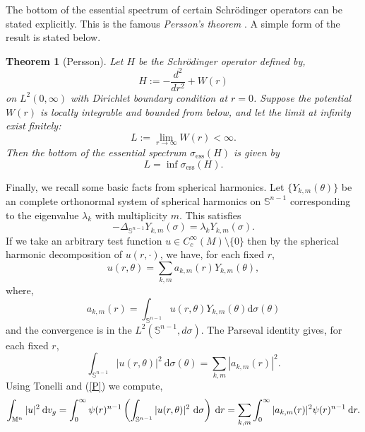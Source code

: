 \documentclass[a4paper,11pt,reqno]{amsart}
\renewcommand\eqref[1]{(\ref{#1})}
\theoremstyle{plain}
\newtheorem{theorem}{Theorem}[section]
\numberwithin{equation}{section} \allowdisplaybreaks
\newcommand{\dvg}{\: {\rm d}v_{g}}
\newcommand{\m}{\mathbb{M}^n}
\newcommand{\dr}{\:{\rm d}r}
\newcommand{\sn}{\mathbb{S}^{n-1}}
\begin{document}
The bottom of the essential spectrum of certain Schr\"odinger operators can be stated explicitly. This is the famous \textit{Persson's theorem} \cite{Persson}. A simple form of the result is stated below.
\begin{theorem}[Persson]
    Let $H$ be the Schr\"odinger operator defined by,
    \begin{equation*}
        H:=-\frac{d^2}{dr^2}+W(r)
    \end{equation*}
    on $L^2(0,\infty)$ with Dirichlet boundary condition at $r=0$. Suppose the potential $W(r)$ is locally integrable and bounded from below, and let the limit at infinity exist finitely:
    \begin{equation*}
        L:= \lim_{r \to \infty}W(r)<\infty.
    \end{equation*}
    Then the bottom of the essential spectrum $\sigma_{\text{ess}}(H)$ is given by 
    \begin{equation*}
        L=\inf\sigma_{\text{ess}}(H).
    \end{equation*}
\end{theorem}
\medskip
Finally, we recall some basic facts from spherical harmonics. Let $\{Y_{k,m}(\theta)\}$ be an complete orthonormal system of spherical harmonics on $\sn$ corresponding to the eigenvalue $\lambda_k$ with multiplicity $m$. This satisfies
\begin{equation*}
    -\Delta_{\sn} Y_{k,m}(\sigma)=\lambda_k Y_{k,m}(\sigma).
\end{equation*}
If we take an arbitrary test function $u \in C^{\infty}_{c}(M)\setminus \{0\}$ then by the spherical harmonic decomposition of $u(r,\cdot)$, we have, for each fixed $r$,
\begin{equation*}
    u(r,\theta)= \sum_{k,m} a_{k,m}(r)Y_{k,m}(\theta),
\end{equation*}
where,
\begin{equation*}
    a_{k,m}(r)=\int_{\sn} u(r,\theta)Y_{k,m}(\theta)\mathrm{d}\sigma(\theta)
\end{equation*}
and the convergence is in the $L^2(\sn, d\sigma)$. The Parseval identity gives, for each fixed $r$,
\begin{equation}\label{P}
    \int_{\sn} |u(r,\theta)|^2\ \mathrm{d}\sigma(\theta)= \sum_{k,m}|a_{k,m}(r)|^2.
\end{equation}
Using Tonelli and \eqref{P} we compute,
\begin{equation}\label{denominator}
    \int_{\m}|u|^2\dvg=\int_0^{\infty}\psi(r)^{n-1}\left(\int_{\sn}|u(r,\theta)|^2\ \mathrm{d}\sigma\right)\dr=\sum_{k,m}\int_0^{\infty}|a_{k,m}(r)|^2\psi(r)^{n-1}\dr.
\end{equation}
\end{document}
